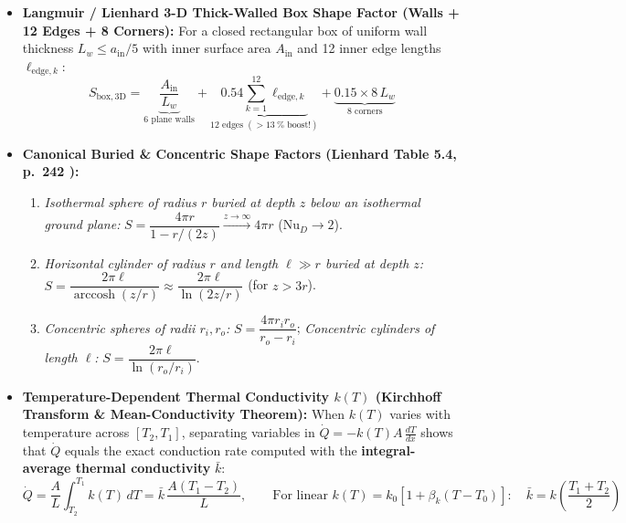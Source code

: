 \begin{itemize}
  \item \textbf{Langmuir / Lienhard 3-D Thick-Walled Box Shape Factor (Walls + 12 Edges + 8 Corners):} For a closed rectangular box of uniform wall thickness $L_w \le a_{\mathrm{in}}/5$ with inner surface area $A_{\mathrm{in}}$ and 12 inner edge lengths $\ell_{\mathrm{edge},k}$:
  \begin{equation}
    S_{\mathrm{box,3D}} = \underbrace{\frac{A_{\mathrm{in}}}{L_w}}_{\text{6 plane walls}} + \underbrace{0.54\sum_{k=1}^{12} \ell_{\mathrm{edge},k}}_{\text{12 edges }(>\SI{13}{\percent}\text{ boost!})} + \underbrace{0.15\times 8\,L_w}_{\text{8 corners}}
    \label{eq:10:langmuir-box}
  \end{equation}
  \item \textbf{Canonical Buried \& Concentric Shape Factors (Lienhard Table 5.4, p.~242 ):}
  \begin{enumerate}
    \item \emph{Isothermal sphere of radius $r$ buried at depth $z$ below an isothermal ground plane:} $S = \dfrac{4\pi r}{1 - r/(2z)} \xrightarrow{z \to \infty} 4\pi r$ ($\mathrm{Nu}_D \to 2$).
    \item \emph{Horizontal cylinder of radius $r$ and length $\ell \gg r$ buried at depth $z$:} $S = \dfrac{2\pi\ell}{\operatorname{arccosh}(z/r)} \approx \dfrac{2\pi\ell}{\ln(2z/r)}$ (for $z > 3r$).
    \item \emph{Concentric spheres of radii $r_i, r_o$:} $S = \dfrac{4\pi r_i r_o}{r_o - r_i}$; \emph{Concentric cylinders of length $\ell$:} $S = \dfrac{2\pi\ell}{\ln(r_o/r_i)}$.
  \end{enumerate}
  \item \textbf{Temperature-Dependent Thermal Conductivity $k(T)$ (Kirchhoff Transform \& Mean-Conductivity Theorem):} When $k(T)$ varies with temperature across $[T_2, T_1]$, separating variables in $\dot{Q} = -k(T)A\,\frac{dT}{dx}$ shows that $\dot{Q}$ equals the exact conduction rate computed with the \textbf{integral-average thermal conductivity} $\bar{k}$:
  \begin{equation}
    \dot{Q} = \frac{A}{L}\int_{T_2}^{T_1} k(T)\,dT = \bar{k}\,\frac{A(T_1 - T_2)}{L}, \qquad \text{For linear } k(T) = k_0\left[1 + \beta_k(T - T_0)\right]:\quad \bar{k} = k\!\left(\frac{T_1 + T_2}{2}\right)
    \label{eq:10:kt-average}
  \end{equation}
\end{itemize}

